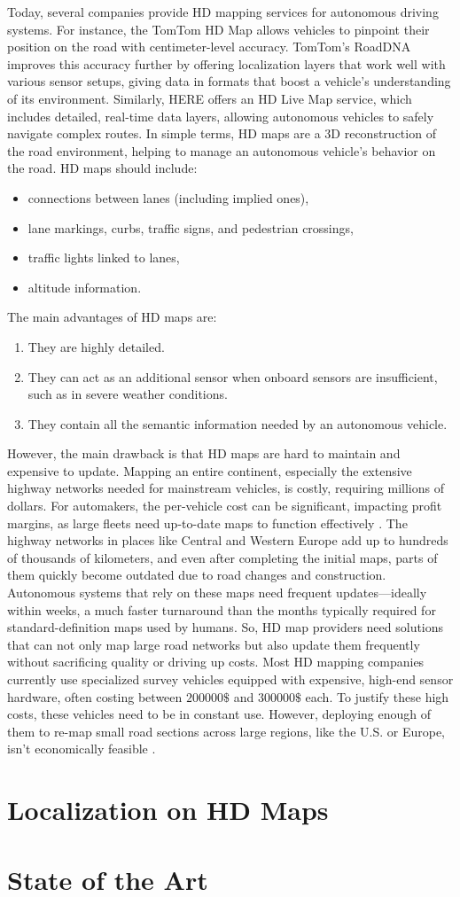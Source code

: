 Today, several companies provide HD mapping services for autonomous driving systems. For instance, the TomTom HD Map allows vehicles to pinpoint their position on the road with centimeter-level accuracy. TomTom’s RoadDNA improves this accuracy further by offering localization layers that work well with various sensor setups, giving data in formats that boost a vehicle’s understanding of its environment. Similarly, HERE offers an HD Live Map service, which includes detailed, real-time data layers, allowing autonomous vehicles to safely navigate complex routes.
In simple terms, HD maps are a 3D reconstruction of the road environment, helping to manage an autonomous vehicle’s behavior on the road. HD maps should include:
\begin{itemize}
    \item connections between lanes (including implied ones),
    \item lane markings, curbs, traffic signs, and pedestrian crossings,
    \item traffic lights linked to lanes,
    \item altitude information.
\end{itemize}
The main advantages of HD maps are:
\begin{enumerate}
    \item They are highly detailed.
    \item They can act as an additional sensor when onboard sensors are insufficient, such as in severe weather conditions.
    \item They contain all the semantic information needed by an autonomous vehicle.
\end{enumerate}

However, the main drawback is that HD maps are hard to maintain and expensive to update. Mapping an entire continent, especially the extensive highway networks needed for mainstream vehicles, is costly, requiring millions of dollars. For automakers, the per-vehicle cost can be significant, impacting profit margins, as large fleets need up-to-date maps to function effectively \cite{gitlin2017detailedmaps}.
The highway networks in places like Central and Western Europe add up to hundreds of thousands of kilometers, and even after completing the initial maps, parts of them quickly become outdated due to road changes and construction. Autonomous systems that rely on these maps need frequent updates—ideally within weeks, a much faster turnaround than the months typically required for standard-definition maps used by humans.
So, HD map providers need solutions that can not only map large road networks but also update them frequently without sacrificing quality or driving up costs. Most HD mapping companies currently use specialized survey vehicles equipped with expensive, high-end sensor hardware, often costing between $200000\$$ and $300000\$$ each. To justify these high costs, these vehicles need to be in constant use. However, deploying enough of them to re-map small road sections across large regions, like the U.S. or Europe, isn’t economically feasible \cite{dahlstrom2021hdmaps}.

\section{Localization on HD Maps}

\section{State of the Art}